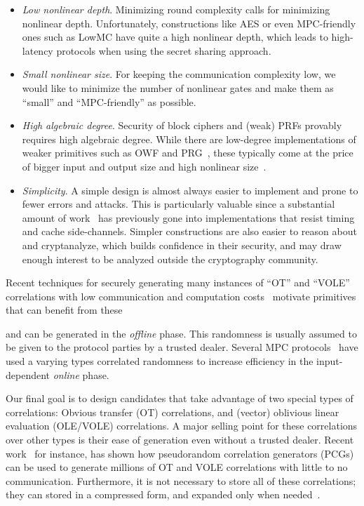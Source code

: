 \begin{itemize}[itemsep=1ex]
    \item \textit{Low nonlinear depth}. Minimizing round complexity calls for minimizing nonlinear depth. Unfortunately, constructions like AES or even MPC-friendly ones such as LowMC have quite a high nonlinear depth, which leads to high-latency protocols when using the secret sharing approach.
    
\item \textit{Small nonlinear size}.
 For keeping the communication complexity low, we would like to minimize the number of nonlinear gates and make them as ``small'' and ``MPC-friendly'' as possible. 

\item \textit{High algebraic degree}.
Security of block ciphers and (weak) PRFs provably requires high algebraic degree. While there are low-degree implementations of weaker primitives such as OWF and PRG~\cite{MQref,Goldreich,AIK05}, these typically come at the price of bigger input and output size and high nonlinear size~\cite{AsiacryptCouteau}.
    
    \item \textit{Simplicity}.  A simple design is almost always easier to implement and prone to fewer errors and attacks. This is particularly valuable since a substantial amount of work~\cite{?} has previously gone into implementations that resist timing and cache side-channels. Simpler constructions are also easier to reason about and cryptanalyze, which builds confidence in their security, and may draw enough interest to be analyzed outside the cryptography community.
\end{itemize}

\iffalse     
    Recent techniques for securely generating many instances of ``OT'' and ``VOLE'' correlations  with low communication and computation costs~\cite{BCGI18,BCGKIS19,more} motivate primitives that can benefit from these
    
    and can be generated in the \textit{offline} phase. This randomness is usually assumed to be given to the protocol parties by a trusted dealer. Several MPC protocols~\cite{?} have used a varying types correlated randomness to increase efficiency in the input-dependent \textit{online} phase.

    \hspace*{1em} Our final goal is to design candidates that take advantage of two special types of correlations: Obvious transfer (OT) correlations, and (vector) oblivious linear evaluation (OLE/VOLE) correlations. A major selling point for these correlations over other types is their ease of generation even without a trusted dealer. Recent work~\cite{?} for instance, has shown how pseudorandom correlation generators (PCGs) can be used to generate millions of OT and VOLE correlations with little to no communication. Furthermore, it is not necessary to store all of these correlations; they can stored in a compressed form, and expanded only when needed~\cite{?}.


